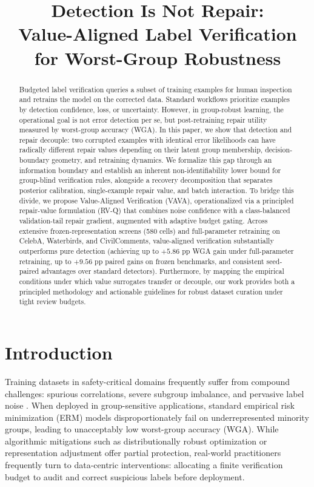 \documentclass{article}
\title{Detection Is Not Repair:\\
Value-Aligned Label Verification for Worst-Group Robustness}
\author{}
\date{}
\begin{document}
\maketitle

\begin{abstract}
Budgeted label verification queries a subset of training examples for human inspection and retrains the model on the corrected data. Standard workflows prioritize examples by detection confidence, loss, or uncertainty. However, in group-robust learning, the operational goal is not error detection per se, but post-retraining repair utility measured by worst-group accuracy (WGA). In this paper, we show that detection and repair decouple: two corrupted examples with identical error likelihoods can have radically different repair values depending on their latent group membership, decision-boundary geometry, and retraining dynamics. We formalize this gap through an information boundary and establish an inherent non-identifiability lower bound for group-blind verification rules, alongside a recovery decomposition that separates posterior calibration, single-example repair value, and batch interaction. To bridge this divide, we propose Value-Aligned Verification (VAVA), operationalized via a principled repair-value formulation (RV-Q) that combines noise confidence with a class-balanced validation-tail repair gradient, augmented with adaptive budget gating. Across extensive frozen-representation screens (580 cells) and full-parameter retraining on CelebA, Waterbirds, and CivilComments, value-aligned verification substantially outperforms pure detection (achieving up to $+5.86$ pp WGA gain under full-parameter retraining, up to $+9.56$ pp paired gains on frozen benchmarks, and consistent seed-paired advantages over standard detectors). Furthermore, by mapping the empirical conditions under which value surrogates transfer or decouple, our work provides both a principled methodology and actionable guidelines for robust dataset curation under tight review budgets.
\end{abstract}

\section{Introduction}
\label{sec:intro}

Training datasets in safety-critical domains frequently suffer from compound challenges: spurious correlations, severe subgroup imbalance, and pervasive label noise \citep{sagawa2019distributionally,borkan2019nuanced}. When deployed in group-sensitive applications, standard empirical risk minimization (ERM) models disproportionately fail on underrepresented minority groups, leading to unacceptably low worst-group accuracy (WGA). While algorithmic mitigations such as distributionally robust optimization \citep{sagawa2019distributionally} or representation adjustment \citep{kirichenko2023last} offer partial protection, real-world practitioners frequently turn to data-centric interventions: allocating a finite verification budget to audit and correct suspicious labels before deployment.
\end{document}
